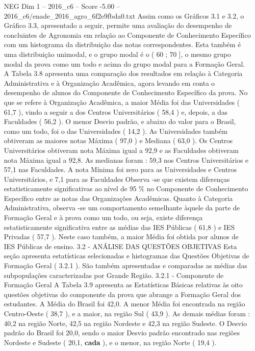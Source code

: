 \begin{textsample}{NEG Dim 1 – 2016\_c6 – Score -5.00 – 2016\_c6/enade\_2016\_agro\_6f2e9fbda0.txt}
Assim como os Gráficos 3.1 e 3.2, o Gráfico 3.3, apresentado a seguir, permite uma avaliação do desempenho de concluintes de Agronomia em relação ao Componente de Conhecimento Específico com um histograma da distribuição das notas correspondentes.
Esta também é uma distribuição unimodal, e o grupo modal é o ( 60 ; 70 ], o mesmo grupo modal da prova como um todo e acima do grupo modal para a Formação Geral.
A Tabela 3.8 apresenta uma comparação dos resultados em relação à Categoria Administrativa e à Organização Acadêmica, agora levando em conta o desempenho de alunos do Componente de Conhecimento Específico da prova.
No que se refere à Organização Acadêmica, a maior Média foi das Universidades ( 61,7 ), vindo a seguir a dos Centros Universitários ( 58,4 ) e, depois, a das Faculdades ( 56,2 ).
O menor Desvio padrão, e abaixo do valor para o Brasil, como um todo, foi o das Universidades ( 14,2 ).
As Universidades também obtiveram as maiores notas Máxima ( 97,0 ) e Mediana ( 63,0 ).
Os Centros Universitários obtiveram nota Máxima igual a 92,9 e as Faculdades obtiveram nota Máxima igual a 92,8.
As medianas foram : 59,3 nos Centros Universitários e 57,1 nas Faculdades.
A nota Mínima foi zero para as Universidades e Centros Universitários, e 7,1 para as Faculdades Observa -se que existem diferenças estatisticamente significativas ao nível de 95 \% no Componente de Conhecimento Específico entre as notas das Organizações Acadêmicas.
Quanto à Categoria Administrativa, observa -se um comportamento semelhante àquele da parte de Formação Geral e à prova como um todo, ou seja, existe diferença estatisticamente significativa entre as médias das IES Públicas ( 61,8 ) e IES Privadas ( 57,7 ).
Neste caso também, a maior Média foi obtida por alunos de IES Públicas de ensino. 3.2 - ANÁLISE DAS QUESTÕES OBJETIVAS Esta seção apresenta estatísticas selecionadas e histogramas das Questões Objetivas de Formação Geral ( 3.2.1 ).
São também apresentadas e comparadas as médias das subpopulações caracterizadas por Grande Região. 3.2.1 - Componente de Formação Geral A Tabela 3.9 apresenta as Estatísticas Básicas relativas às oito questões objetivas do componente da prova que abrange a Formação Geral dos estudantes.
A Média do Brasil foi 42,0.
A menor Média foi encontrada na região Centro-Oeste ( 38,7 ), e a maior, na região Sul ( 43,9 ).
As demais médias foram : 40,2 na região Norte, 42,5 na região Nordeste e 42,3 na região Sudeste.
O Desvio padrão do Brasil foi 20,0, sendo o maior Desvio padrão encontrado nas regiões Nordeste e Sudeste ( 20,1, \textbf{cada} ), e o menor, na região Norte ( 19,4 ).

\end{textsample}
